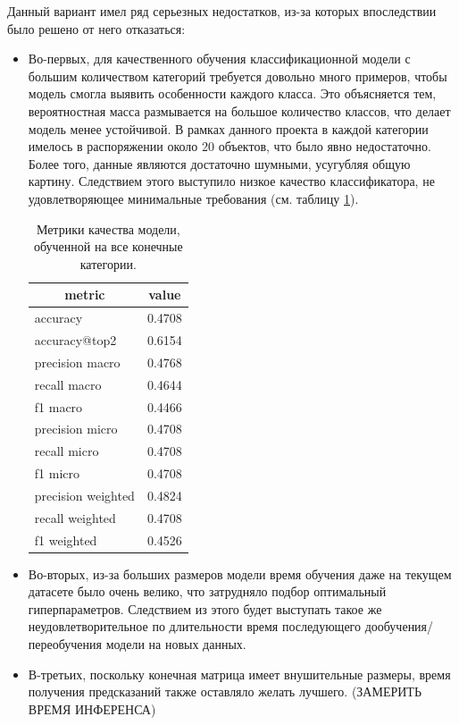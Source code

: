 \documentclass[a4paper,12pt]{extarticle}
\begin{document}
Данный вариант имел ряд серьезных недостатков, из-за которых впоследствии было решено от него отказаться:
\begin{itemize}
	\item Во-первых, для качественного обучения классификационной модели с большим количеством категорий требуется довольно много примеров, чтобы модель смогла выявить особенности каждого класса. Это объясняется тем, вероятностная масса размывается на большое количество классов, что делает модель менее устойчивой. В рамках данного проекта в каждой категории имелось в распоряжении около 20 объектов, что было явно недостаточно. Более того, данные являются достаточно шумными, усугубляя общую картину. Следствием этого выступило низкое качество классификатора, не удовлетворяющее минимальные требования (см. таблицу \ref{table:metrics_all}).
	
	\begin{table}[ht]
		\caption{Метрики качества модели, обученной на все конечные категории.}
		\label{table:metrics_all}
		\footnotesize
		\centering
		\begin{tabular}{l|l}
			\toprule
			\multicolumn{1}{c|}{metric} & \multicolumn{1}{c}{value}\\
			\midrule
			accuracy           & 0.4708\\
			accuracy@top2      & 0.6154\\
			precision macro    & 0.4768\\
			recall macro       & 0.4644\\
			f1 macro           & 0.4466\\
			precision micro    & 0.4708\\
			recall micro       & 0.4708\\
			f1 micro           & 0.4708\\
			precision weighted & 0.4824\\
			recall weighted    & 0.4708\\
			f1 weighted        & 0.4526\\
			\bottomrule
		\end{tabular}
	\end{table}
	
	\item Во-вторых, из-за больших размеров модели время обучения даже на текущем датасете было очень велико, что затрудняло подбор оптимальный гиперпараметров. Следствием из этого будет выступать такое же неудовлетворительное по длительности время последующего дообучения/переобучения модели на новых данных.
	\item В-третьих, поскольку конечная матрица имеет внушительные размеры, время получения предсказаний также оставляло желать лучшего. (ЗАМЕРИТЬ ВРЕМЯ ИНФЕРЕНСА)
\end{itemize}
\end{document}
